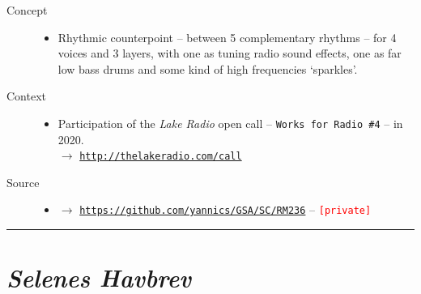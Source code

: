 \begin{description}
\item[Concept] \hfill 
\begin{itemize}
\item[] Rhythmic counterpoint -- between 5 complementary rhythms -- for 4 voices and 3 layers, with one as tuning radio sound effects, one as far low bass drums and some kind of high frequencies `sparkles'.
\end{itemize}
\bigskip
\item[Context] \hfill 
\begin{itemize}
\item[] Participation of the \textit{Lake Radio} open call -- \texttt{Works for Radio \#4} -- in 2020. \\
$\rightarrow$ \href{http://thelakeradio.com/call}{\texttt{\small http://thelakeradio.com/call}}
\end{itemize}
\bigskip
\bigskip
\item[Source] \hfill 
\begin{itemize}
\item[] $\rightarrow$ \href{https://github.com/yannics/GSA/SC/RM236}{\texttt{\small https://github.com/yannics/GSA/SC/RM236}}  -- \texttt{\textcolor{red}{\small[private]}}
\end{itemize}
\end{description}

\bigskip

\begin{center}\rule{0.5\linewidth}{0.5pt}\end{center}

\bigskip


\section*{\textsl{Selenes Havbrev}}


\bigskip

